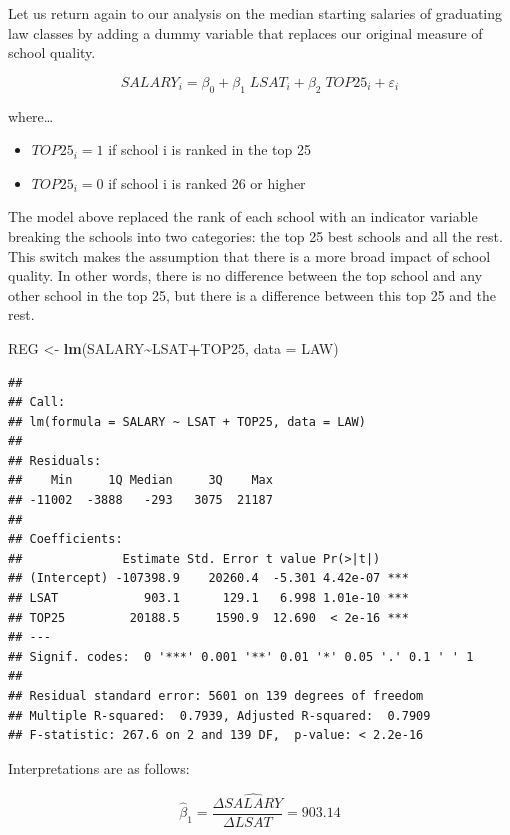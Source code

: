 \documentclass[
]{book}
\newenvironment{Shaded}{\begin{snugshade}}{\end{snugshade}}
\newcommand{\AttributeTok}[1]{\textcolor[rgb]{0.13,0.29,0.53}{#1}}
\newcommand{\FunctionTok}[1]{\textcolor[rgb]{0.13,0.29,0.53}{\textbf{#1}}}
\newcommand{\NormalTok}[1]{#1}
\newcommand{\OtherTok}[1]{\textcolor[rgb]{0.56,0.35,0.01}{#1}}
\newcommand{\SpecialCharTok}[1]{\textcolor[rgb]{0.81,0.36,0.00}{\textbf{#1}}}
\begin{document}
Let us return again to our analysis on the median starting salaries of graduating law classes by adding a dummy variable that replaces our original measure of school quality.

\[SALARY_i = \beta_0 + \beta_1 \; LSAT_i + \beta_2 \; TOP25_i + \varepsilon_i\]

where\ldots{}

\begin{itemize}
\item
  \(TOP25_i = 1\) if school i is ranked in the top 25
\item
  \(TOP25_i = 0\) if school i is ranked 26 or higher
\end{itemize}

The model above replaced the rank of each school with an indicator variable breaking the schools into two categories: the top 25 best schools and all the rest. This switch makes the assumption that there is a more broad impact of school quality. In other words, there is no difference between the top school and any other school in the top 25, but there is a difference between this top 25 and the rest.

\begin{Shaded}
\begin{Highlighting}[]
\NormalTok{REG }\OtherTok{\textless{}{-}} \FunctionTok{lm}\NormalTok{(SALARY}\SpecialCharTok{\textasciitilde{}}\NormalTok{LSAT}\SpecialCharTok{+}\NormalTok{TOP25, }\AttributeTok{data =}\NormalTok{ LAW)}
\end{Highlighting}
\end{Shaded}

\begin{verbatim}
## 
## Call:
## lm(formula = SALARY ~ LSAT + TOP25, data = LAW)
## 
## Residuals:
##    Min     1Q Median     3Q    Max 
## -11002  -3888   -293   3075  21187 
## 
## Coefficients:
##              Estimate Std. Error t value Pr(>|t|)    
## (Intercept) -107398.9    20260.4  -5.301 4.42e-07 ***
## LSAT            903.1      129.1   6.998 1.01e-10 ***
## TOP25         20188.5     1590.9  12.690  < 2e-16 ***
## ---
## Signif. codes:  0 '***' 0.001 '**' 0.01 '*' 0.05 '.' 0.1 ' ' 1
## 
## Residual standard error: 5601 on 139 degrees of freedom
## Multiple R-squared:  0.7939, Adjusted R-squared:  0.7909 
## F-statistic: 267.6 on 2 and 139 DF,  p-value: < 2.2e-16
\end{verbatim}

Interpretations are as follows:

\[\hat{\beta}_1 = \frac{\Delta \widehat{SALARY}}{\Delta LSAT} =  903.14\]
\end{document}

